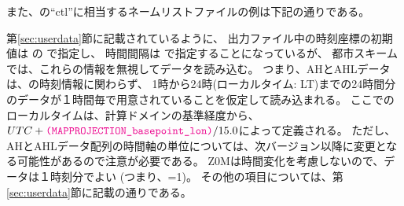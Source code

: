 また、\grads の``ctl''に相当するネームリストファイルの例は下記の通りである。


第\ref{sec:userdata}節に記載されているように、
出力ファイル中の時刻座標の初期値は  の で指定し、
時間間隔は  で指定することになっているが、
都市スキームでは、これらの情報を無視してデータを読み込む。
%
つまり、AHとAHLデータは、\scalenetcdf の時刻情報に関わらず、
1時から24時(ローカルタイム: LT)までの24時間分のデータが１時間毎で用意されていることを仮定して読み込まれる。
ここでのローカルタイムは、計算ドメインの基準経度から、$UTC + \nmitem{MAPPROJECTION_basepoint_lon}/15.0$によって定義される。
ただし、AHとAHLデータ配列の時間軸の単位については、次バージョン以降に変更となる可能性があるので注意が必要である。
Z0Mは時間変化を考慮しないので、データは１時刻分でよい (つまり、=1)。
その他の項目については、第\ref{sec:userdata}節に記載の通りである。



